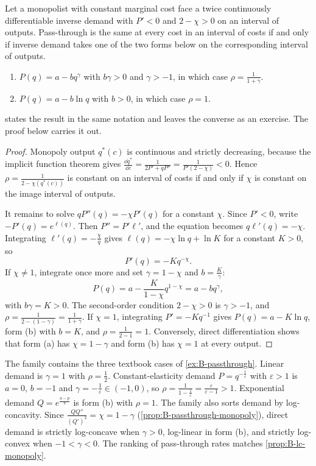 \begin{proposition}\label{prop:B-constant-pt}
Let a monopolist with constant marginal cost face a twice continuously differentiable inverse demand with
$P' < 0$ and $2 - \chi > 0$ on an interval of outputs. Pass-through is the same at every cost in an interval of
costs if and only if inverse demand takes one of the two forms below on the corresponding interval of outputs.
\begin{enumerate}[label=(\alph*)]
  \item $P(q) = a - bq^\gamma$ with $b\gamma > 0$ and $\gamma > -1$, in which case $\rho = \frac{1}{1 + \gamma}$.
  \item $P(q) = a - b\ln q$ with $b > 0$, in which case $\rho = 1$.
\end{enumerate}
\end{proposition}

 states the result in the same notation and leaves the converse as an exercise. The
proof below carries it out.

\begin{proof}
Monopoly output $q^*(c)$ is continuous and strictly decreasing, because the implicit function theorem gives
$\frac{\dd q^*}{\dd c} = \frac{1}{2P' + qP''} = \frac{1}{P'(2 - \chi)} < 0$. Hence $\rho = \frac{1}{2 - \chi(q^*(c))}$ is
constant on an interval of costs if and only if $\chi$ is constant on the image interval of outputs.

It remains to solve $qP''(q) = -\chi P'(q)$ for a constant $\chi$. Since $P' < 0$, write $-P'(q) = e^{\ell(q)}$. Then
$P'' = P'\ell'$, and the equation becomes $q\ell'(q) = -\chi$. Integrating $\ell'(q) = -\frac{\chi}{q}$ gives
$\ell(q) = -\chi\ln q + \ln K$ for a constant $K > 0$, so
\[
  P'(q) = -Kq^{-\chi}.
\]
If $\chi \neq 1$, integrate once more and set $\gamma = 1 - \chi$ and $b = \frac{K}{\gamma}$:
\[
  P(q) = a - \frac{K}{1 - \chi}q^{1 - \chi} = a - bq^\gamma,
\]
with $b\gamma = K > 0$. The second-order condition $2 - \chi > 0$ is $\gamma > -1$, and
$\rho = \frac{1}{2 - (1 - \gamma)} = \frac{1}{1 + \gamma}$. If $\chi = 1$, integrating $P' = -Kq^{-1}$ gives
$P(q) = a - K\ln q$, form (b) with $b = K$, and $\rho = \frac{1}{2 - 1} = 1$. Conversely, direct differentiation shows
that form (a) has $\chi = 1 - \gamma$ and form (b) has $\chi = 1$ at every output.
\end{proof}

The family contains the three textbook cases of \cref{ex:B-passthrough}. Linear demand is $\gamma = 1$ with
$\rho = \frac{1}{2}$. Constant-elasticity demand $P = q^{-\frac{1}{\varepsilon}}$ with $\varepsilon > 1$ is $a = 0$,
$b = -1$ and $\gamma = -\frac{1}{\varepsilon} \in (-1, 0)$, so $\rho = \frac{1}{1 - \frac{1}{\varepsilon}} = \frac{\varepsilon}{\varepsilon - 1} > 1$.
Exponential demand $Q = e^{\frac{a - p}{b}}$ is form (b) with $\rho = 1$. The family also sorts demand by
log-concavity. Since $\frac{QQ''}{(Q')^2} = \chi = 1 - \gamma$ (\cref{prop:B-passthrough-monopoly}), direct demand is strictly
log-concave when $\gamma > 0$, log-linear in form (b), and strictly log-convex when $-1 < \gamma < 0$. The ranking
of pass-through rates matches \cref{prop:B-lc-monopoly}.

